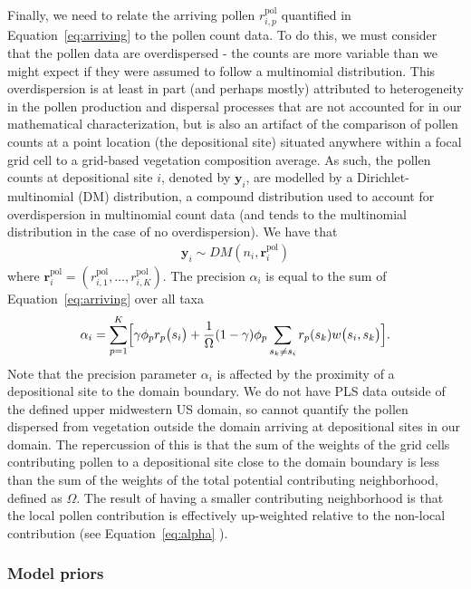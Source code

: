 \documentclass[12pt]{article}
\begin{document}
Finally, we need to relate the arriving pollen $r_{i,p}^{\text{pol}}$
quantified in Equation~\ref{eq:arriving} to the pollen count data. To
do this, we must consider that the pollen data are overdispersed - the
counts are more variable than we might expect if they were assumed to
follow a multinomial distribution. This overdispersion is at least in
part (and perhaps mostly) attributed to heterogeneity in the pollen
production and dispersal processes that are not accounted for in our
mathematical characterization, but is also an artifact of the
comparison of pollen counts at a point location (the depositional
site) situated anywhere within a focal grid cell to a grid-based
vegetation composition average. As such, the pollen counts at
depositional site $i$, denoted by $\bm{y}_i$, are modelled by a
Dirichlet-multinomial (DM) distribution, a compound distribution used
to account for overdispersion in multinomial count data (and tends to
the multinomial distribution in the case of no overdispersion). We
have that
\begin{align}
\bm{y}_i \sim DM (n_i, \bm{r}_i^{\text{pol}})
\label{eq:DM}
\end{align}
where $\bm{r}_i^{\text{pol}} = (r_{i,1}^{\text{pol}}, \ldots,
r_{i,K}^{\text{pol}})$.  The precision $\alpha_i$ is equal to the sum
of Equation~\ref{eq:arriving} over all taxa
\begin{align}
\alpha_i = \sum_{p=1}^K \Bigl[\gamma \phi_p r_p\bigl(s_i\bigr) + \frac{1}{\Omega} (1-\gamma) \phi_p \sum_{s_k \neq s_i } r_p(s_k) w\bigl(s_i, s_k\bigr)\Bigr].
\label{eq:alpha}
\end{align}
Note that the precision parameter $\alpha_i$ is affected by the
proximity of a depositional site to the domain boundary. We do not
have PLS data outside of the defined upper midwestern US domain, so
cannot quantify the pollen dispersed from vegetation outside the
domain arriving at depositional sites in our domain. The repercussion
of this is that the sum of the weights of the grid cells contributing
pollen to a depositional site close to the domain boundary is less
than the sum of the weights of the total potential contributing
neighborhood, defined as $\Omega$. The result of having a smaller
contributing neighborhood is that the local pollen contribution is
effectively up-weighted relative to the non-local contribution (see
Equation~\ref{eq:alpha} ).

\subsubsection{Model priors}
\end{document}
